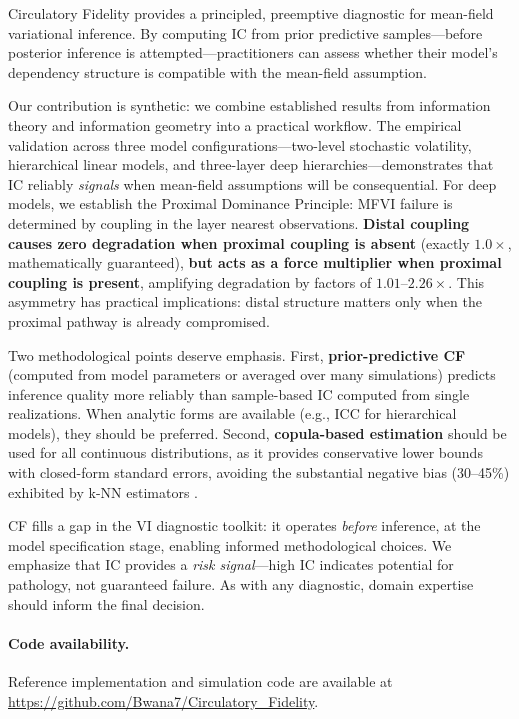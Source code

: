 \documentclass[10pt]{article} %
\theoremstyle{plain}
\theoremstyle{definition}
\begin{document}
Circulatory Fidelity provides a principled, preemptive diagnostic for mean-field variational inference. By computing IC from prior predictive samples---before posterior inference is attempted---practitioners can assess whether their model's dependency structure is compatible with the mean-field assumption.

Our contribution is synthetic: we combine established results from information theory \citep{kvalseth1987entropy,vinh2010information} and information geometry \citep{amari2016information} into a practical workflow. The empirical validation across three model configurations---two-level stochastic volatility, hierarchical linear models, and three-layer deep hierarchies---demonstrates that IC reliably \emph{signals} when mean-field assumptions will be consequential. For deep models, we establish the Proximal Dominance Principle: MFVI failure is determined by coupling in the layer nearest observations. \textbf{Distal coupling causes zero degradation when proximal coupling is absent} (exactly $1.0\times$, mathematically guaranteed), \textbf{but acts as a force multiplier when proximal coupling is present}, amplifying degradation by factors of $1.01$--$2.26\times$. This asymmetry has practical implications: distal structure matters only when the proximal pathway is already compromised.

Two methodological points deserve emphasis. First, \textbf{prior-predictive CF} (computed from model parameters or averaged over many simulations) predicts inference quality more reliably than sample-based IC computed from single realizations. When analytic forms are available (e.g., ICC for hierarchical models), they should be preferred. Second, \textbf{copula-based estimation} should be used for all continuous distributions, as it provides conservative lower bounds with closed-form standard errors, avoiding the substantial negative bias (30--45\%) exhibited by k-NN estimators \citep{vandenberg2025linfoot}.

CF fills a gap in the VI diagnostic toolkit: it operates \emph{before} inference, at the model specification stage, enabling informed methodological choices. We emphasize that IC provides a \emph{risk signal}---high IC indicates potential for pathology, not guaranteed failure. As with any diagnostic, domain expertise should inform the final decision.

\paragraph{Code availability.} Reference implementation and simulation code are available at \url{https://github.com/Bwana7/Circulatory_Fidelity}.
\end{document}
